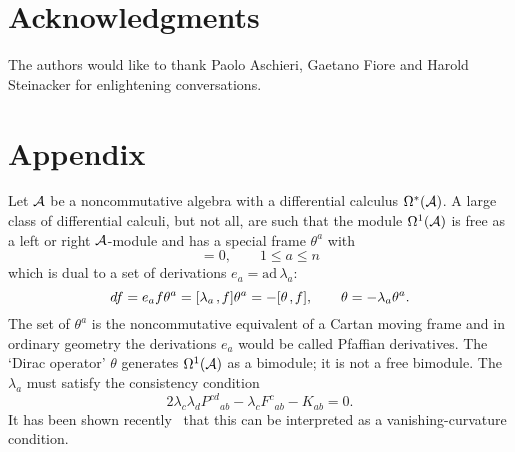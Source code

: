 \documentclass[a4paper,12pt]{article}
\def\ad{\mbox{ad}\,}
\def\c#1{{\cal #1}}
\def\k{\kern-.1em\mathbin{,}\kern-.1em}
\newcommand{\initiate}{\setcounter{equation}{0}}
\begin{document}
\initiate
\section*{Acknowledgments} 

The authors would like to thank Paolo Aschieri, Gaetano Fiore and
Harold Steinacker for enlightening conversations.


\initiate
\section{Appendix} 

Let $\c{A}$ be a noncommutative algebra with a differential calculus
$\Omega^*(\c{A})$.  A large class of differential calculi, but not
all, are such that the module $\Omega^1(\c{A})$ is free as a left or
right $\c{A}$-module and has a special frame $\theta^a$ with
\begin{equation}
[f\k \theta^a] = 0, \qquad 1 \leq a \leq n                 \label{frame}
\end{equation}
which is dual to a set of derivations $e_a = \ad \lambda_a$:
\begin{equation}
df = e_a f \theta^a = [\lambda_a\k f] \theta^a = 
- [\theta\k f], \qquad \theta = -\lambda_a \theta^a.         \label{dual}
\end{equation}
The set of $\theta^a$ is the noncommutative equivalent of a Cartan
moving frame and in ordinary geometry the derivations $e_a$ would be
called Pfaffian derivatives. The `Dirac operator' $\theta$ generates
$\Omega^1(\c{A})$ as a bimodule; it is not a free bimodule.  The
$\lambda_a$ must satisfy the consistency condition~\cite{DimMad96}
\begin{equation}
2 \lambda_c \lambda_d P^{cd}{}_{ab} - 
\lambda_c F^c{}_{ab} - K_{ab} = 0.                           \label{fund-eq}
\end{equation}
It has been shown recently~\cite{MadSchSchWes00a} that this can be
interpreted as a vanishing-curvature condition.
\end{document}
